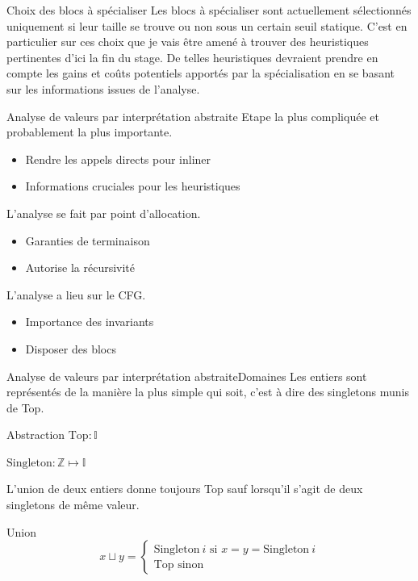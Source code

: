\documentclass{beamer}
\begin{document}
\begin{frame}{Choix des blocs à spécialiser}
    Les blocs à spécialiser sont actuellement sélectionnés uniquement si leur taille se trouve ou non sous un certain seuil statique. C'est en particulier sur ces choix que je vais être amené à trouver des heuristiques pertinentes d'ici la fin du stage. De telles heuristiques devraient prendre en compte les gains et coûts potentiels apportés par la spécialisation en se basant sur les informations issues de l'analyse.
\end{frame}
\fi

\begin{frame}{Analyse de valeurs par interprétation abstraite}
    Etape la plus compliquée et probablement la plus importante.
    \begin{itemize}
        \item Rendre les appels directs pour inliner
        \item Informations cruciales pour les heuristiques
    \end{itemize}

    L'analyse se fait par point d'allocation.
    \begin{itemize}
        \item Garanties de terminaison
        \item Autorise la récursivité
    \end{itemize}

    L'analyse a lieu sur le CFG.
    \begin{itemize}
        \item Importance des invariants
        \item Disposer des blocs
    \end{itemize}
\end{frame}

\begin{frame}{Analyse de valeurs par interprétation abstraite}{Domaines}
    Les entiers sont représentés de la manière la plus simple qui soit, c'est à dire des singletons munis de Top.
    
    \begin{block}{Abstraction}
        $\text{Top} : \mathbb{I}$

        $\text{Singleton} : \mathbb{Z} \mapsto \mathbb{I}$
    \end{block}

    L'union de deux entiers donne toujours Top sauf lorsqu'il s'agit de deux singletons de même valeur.

    \begin{block}{Union}
        $$
        x \sqcup y =
        \begin{cases}
            \text{Singleton} ~ i \text{ si } x = y = \text{Singleton} ~ i  \\
            \text{Top} \text{ sinon}
        \end{cases}
        $$
    \end{block}
\end{frame}
\end{document}

